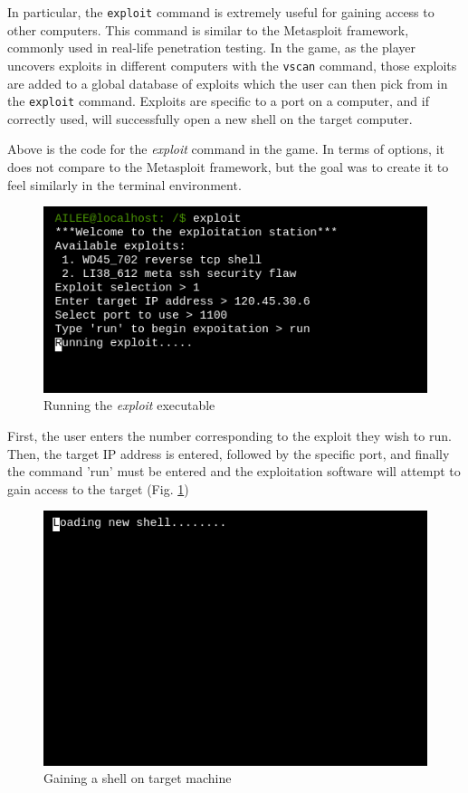 \documentclass[conference]{IEEEtran}
\begin{document}
In particular, the \texttt{exploit} command is extremely useful for gaining access to other computers.  This command is similar to the Metasploit framework, commonly used in real-life penetration testing.  In the game, as the player uncovers exploits in different computers with the \texttt{vscan} command, those exploits are added to a global database of exploits which the user can then pick from in the \texttt{exploit} command.  Exploits are specific to a port on a computer, and if correctly used, will successfully open a new shell on the target computer.



Above is the code for the \textit{exploit} command in the game. In terms of options, it does not compare to the Metasploit framework, but the goal was to create it to feel similarly in the terminal environment.

\begin{figure}[h]
	\centerline{\includegraphics[scale=2]{exploit-pic}}
	\caption{Running the \textit{exploit} executable}
	\label{fig:exploit-pic}
\end{figure}

First, the user enters the number corresponding to the exploit they wish to run. Then, the target IP address is entered, followed by the specific port, and finally the command 'run' must be entered and the exploitation software will attempt to gain access to the target (Fig. \ref{fig:exploit-pic}) 

\begin{figure}[h]
	\centerline{\includegraphics[scale=2]{loading-new-shell}}
	\caption{Gaining a shell on target machine}
	\label{fig:loading}
\end{figure}
\end{document}
